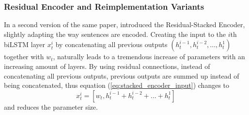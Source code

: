 \subsubsection{Residual Encoder and Reimplementation Variants}
In a second version of the same paper, \cite{nie2017shortcut} introduced the Residual-Stacked Encoder, slightly adapting the way sentences are encoded. Creating the input to the $i$th \ac{biLSTM} layer $x_t^i$ by concatenating all previous outputs $(h_t^{i-1}, h_t^{i-2}, ... , h_t^1)$ together with $w_t$, naturally leads to a tremendous increase of parameters with an increasing amount of layers. By using residual connections, instead of concatenating all previous outputs, previous outputs are summed up instead of being concatenated, thus equation (\ref{eq:stacked_encoder_input}) changes to
\begin{equation}
x_t^i = [w_t, h_t^{i-1} + h_t^{i-2} + ... + h_t^1]
\end{equation}
and reduces the parameter size.
